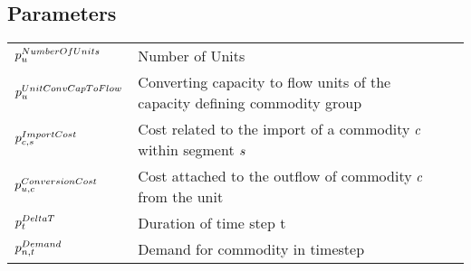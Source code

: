 \subsection*{Parameters}
\vspace{-1em}
	\begin{longtable}{p{\cola} p{\colc} >{\small\raggedleft\arraybackslash\itshape}p{\colb}}

		$p^{NumberOfUnits}_{u}$	& Number of Units                                             	&                \\
		$p^{UnitConvCapToFlow}_{u}$	& Converting capacity to flow units of the capacity defining commodity group	&                \\[0.5em]

		$p^{ImportCost}_{c,s}   $	& Cost related to the import of a commodity $c$ within segment $s$ 	&                \\[0.5em]

		$p^{ConversionCost}_{u,c}$	& Cost attached to the outflow of commodity $c$ from the unit	&                \\[0.5em]

		$p^{DeltaT}_{t}       $	& Duration of time step t                                     	&                \\[0.5em]

		$p^{Demand}_{n,t}       $	& Demand for commodity \commodity in timestep \timestep       	&                \\[0.5em]


\end{longtable}

